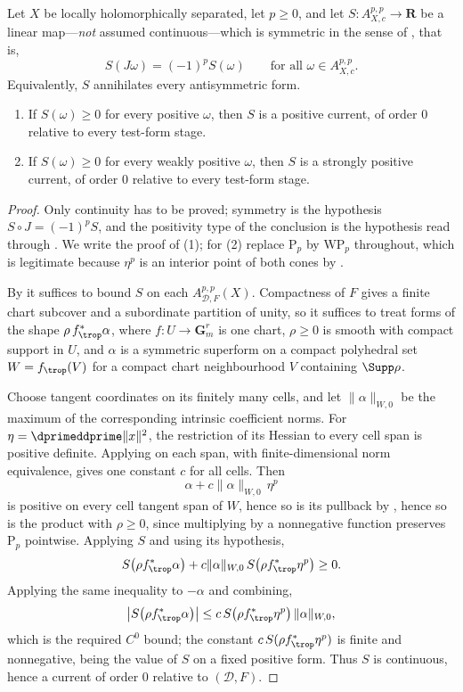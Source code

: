 \begin{proposition}
\label{prop:ch14-automatic-continuity}
Let $X$ be locally holomorphically separated, let $p\ge0$,
and let $S:A_{X,c}^{p,p}\to\mathbf R$ be a linear map---\emph{not} assumed
continuous---which is symmetric in the sense of
, that is,
\[
 S(J\omega)=(-1)^pS(\omega)
 \qquad\text{for all }\omega\in A_{X,c}^{p,p}.
\]
Equivalently, $S$ annihilates every antisymmetric form.
\begin{enumerate}
\item If $S(\omega)\ge0$ for every positive $\omega$, then $S$ is a positive
  current, of order $0$ relative to every test-form stage.
\item If $S(\omega)\ge0$ for every weakly positive $\omega$, then $S$ is a
  strongly positive current, of order $0$ relative to every test-form stage.
\end{enumerate}
\end{proposition}

\begin{proof}
Only continuity has to be proved; symmetry is the hypothesis
$S\circ J=(-1)^pS$, and the positivity type of the conclusion is the
hypothesis read through .  We write the proof of (1); for (2) replace
$\mathrm{P}_p$ by $\mathrm{WP}_p$ throughout, which is legitimate because
$\eta^p$ is an interior point of both cones by
.

By  it suffices to bound $S$ on
each $A_{\mathscr D,F}^{p,p}(X)$.  Compactness of $F$ gives a finite chart
subcover and a subordinate partition of unity, so it suffices to treat forms
of the shape $\rho\,f_{\trop}^*\alpha$, where
$f:U\to\mathbf G_m^r$ is one chart, $\rho\ge0$ is smooth with compact
support in $U$, and $\alpha$ is a symmetric superform on a compact
polyhedral set $W=f_{\trop}(V)$ for a compact chart neighbourhood
$V$ containing $\Supp\rho$.

Choose tangent coordinates on its finitely many cells, and let
$\|\alpha\|_{W,0}$ be the maximum of the corresponding intrinsic
coefficient norms. For $\eta=\dprimeddprime\|x\|^2$, the restriction
of its Hessian to every cell span is positive definite. Applying
 on each span, with finite-dimensional
norm equivalence, gives one constant $c$ for all cells.  Then
\[
 \alpha+c\|\alpha\|_{W,0}\,\eta^{p}
\]
is positive on every cell tangent span of $W$, hence so is its pullback by
, hence so is the product with
$\rho\ge0$, since multiplying by a nonnegative function preserves
$\mathrm{P}_p$ pointwise.  Applying $S$ and using its hypothesis,
\[
 S\bigl(\rho f_{\trop}^*\alpha\bigr)
  +c\|\alpha\|_{W,0}\,S\bigl(\rho f_{\trop}^*\eta^p\bigr)\ge0 .
\]
Applying the same inequality to $-\alpha$ and combining,
\[
 \bigl|S\bigl(\rho f_{\trop}^*\alpha\bigr)\bigr|
 \le c\,S\bigl(\rho f_{\trop}^*\eta^p\bigr)\,\|\alpha\|_{W,0},
\]
which is the required $C^0$ bound; the constant
$c\,S(\rho f_{\trop}^*\eta^p)$ is finite and nonnegative, being the value of
$S$ on a fixed positive form.  Thus $S$ is continuous, hence a current of
order $0$ relative to $(\mathscr D,F)$.
\end{proof}

